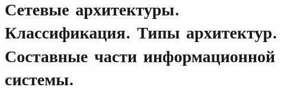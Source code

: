 {
	\section{Сетевые архитектуры. Классификация. Типы архитектур. Составные части информационной системы.}
	\newpage
}
